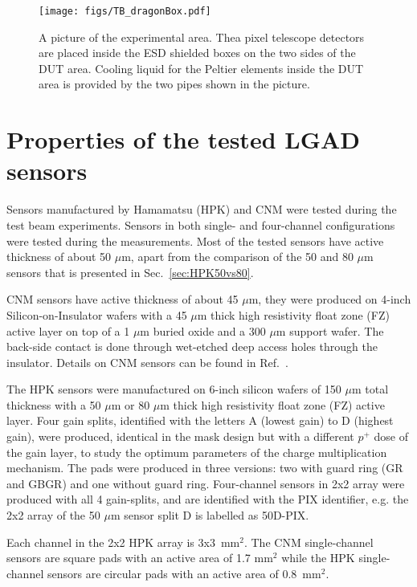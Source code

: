 \documentclass[preprint,1p]{elsarticle}
\begin{document}
\begin{figure}[htbp] 
\centering
\texttt{[image: figs/TB\_dragonBox.pdf]} 
\caption{A picture of the experimental area. Thea pixel telescope detectors are placed inside the ESD shielded boxes on the two sides of the DUT area. Cooling liquid for the Peltier elements inside the DUT area is provided by the two pipes shown in the picture.} 
\label{fig:DragonBox} 
\end{figure} 


\section{Properties of the tested LGAD sensors}


Sensors manufactured by Hamamatsu (HPK) and CNM were tested during the test beam
experiments. Sensors in both single- and four-channel configurations were tested
during the measurements. Most of the tested sensors have active thickness of
about 50 $\mu$m, apart from the comparison of the 50 and 80 $\mu$m sensors that
is presented in Sec.~\ref{sec:HPK50vs80}.

CNM sensors have active thickness of about 45 $\mu$m, they were
produced on 4-inch Silicon-on-Insulator wafers with a 45 $\mu$m thick high
resistivity float zone (FZ) active layer on top of a 1 $\mu$m buried oxide and a
300 $\mu$m support wafer. The back-side contact is done through wet-etched deep
access holes through the insulator. Details on CNM sensors can be found in
Ref.~\cite{CNMSensors, Cartiglia201783}. 

The HPK sensors were manufactured on 6-inch silicon wafers of 150 $\mu$m total
thickness with a 50 $\mu$m or 80 $\mu$m thick high resistivity float zone (FZ)
active layer. Four gain splits, identified with the letters A (lowest gain) to D
(highest gain), were produced, identical in the mask design but with a different
$p^+$ dose of the gain layer, to study the optimum parameters of the charge
multiplication mechanism. The pads were produced in three versions: two with
guard ring (GR and GBGR) and one without guard ring. Four-channel sensors in 2x2
array were produced with all 4 gain-splits, and are identified with the PIX
identifier, e.g. the 2x2 array of the 50 $\mu$m sensor split D is labelled as
50D-PIX. 

Each channel in the 2x2 HPK array is 3x3~mm$^2$. The CNM single-channel sensors
are square pads with an active area of 1.7 mm$^2$ while the HPK single-channel
sensors are circular pads with an active area of 0.8~mm$^2$.
\end{document}

